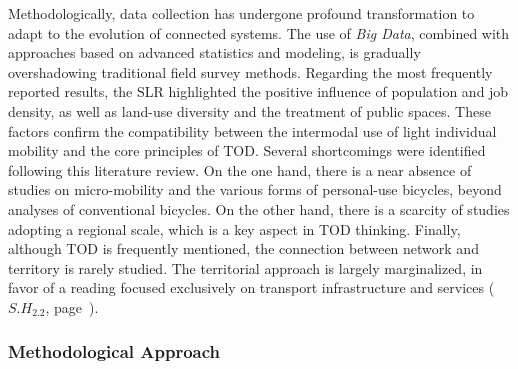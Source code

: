 \begin{refsegment}
Methodologically, data collection has undergone profound transformation to adapt to the evolution of connected systems. The use of \textsl{Big Data}, combined with approaches based on advanced statistics and modeling, is gradually overshadowing traditional field survey methods. Regarding the most frequently reported results, the \acrshort{SLR} highlighted the positive influence of population and job density, as well as land-use diversity and the treatment of public spaces. These factors confirm the compatibility between the intermodal use of light individual mobility and the core principles of \acrshort{TOD}. Several shortcomings were identified following this literature review. On the one hand, there is a near absence of studies on micro-mobility and the various forms of personal-use bicycles, beyond analyses of conventional bicycles. On the other hand, there is a scarcity of studies adopting a regional scale, which is a key aspect in \acrshort{TOD} thinking. Finally, although \acrshort{TOD} is frequently mentioned, the connection between network and territory is rarely studied. The territorial approach is largely marginalized, in favor of a reading focused exclusively on transport infrastructure and services (\hyperref[sous-hypothese-2.2]{\(S.H_{2.2}\)}, page~\pageref{sous-hypothese-2.2}).%

\subsubsection*{Methodological Approach
    \label{conclusion-generale:principaux-apports-chapitre3}
    }


\end{refsegment}
